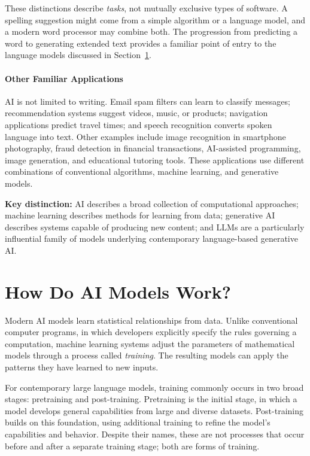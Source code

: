 \documentclass[11pt]{article}
\begin{document}
These distinctions describe \emph{tasks}, not mutually exclusive types
of software. A spelling suggestion might come from a simple algorithm
or a language model, and a modern word processor may combine both.
The progression from predicting a word to generating extended text
provides a familiar point of entry to the language models discussed
in Section~\ref{sec:how-models-work}.

\paragraph{Other Familiar Applications}

AI is not limited to writing. Email spam filters can learn
to classify messages; recommendation systems suggest videos,
music, or products; navigation applications predict travel
times; and speech recognition converts spoken language into
text. Other examples include image recognition in smartphone
photography, fraud detection in financial transactions,
AI-assisted programming, image generation, and
educational tutoring tools. These applications use different
combinations of conventional algorithms, machine learning, and
generative models.

\medskip

\noindent
\textbf{Key distinction:}
AI describes a broad collection of computational approaches;
machine learning describes methods for learning from data;
generative AI describes systems capable of producing new content;
and LLMs are a particularly influential family of models
underlying contemporary language-based generative AI.

\section{How Do AI Models Work?}\label{sec:how-models-work}

Modern AI models learn statistical relationships from data.
Unlike conventional computer programs, in which developers
explicitly specify the rules governing a computation, machine
learning systems adjust the parameters of mathematical models
through a process called \emph{training}. The resulting models
can apply the patterns they have learned to new inputs.

For contemporary large language models, training commonly occurs in two broad stages: pretraining and post-training. Pretraining is the initial stage, in which a model develops general capabilities from large and diverse datasets. Post-training builds on this foundation, using additional training to refine the model's capabilities and behavior. Despite their names, these are not processes that occur before and after a separate training stage; both are forms of training.
\end{document}
